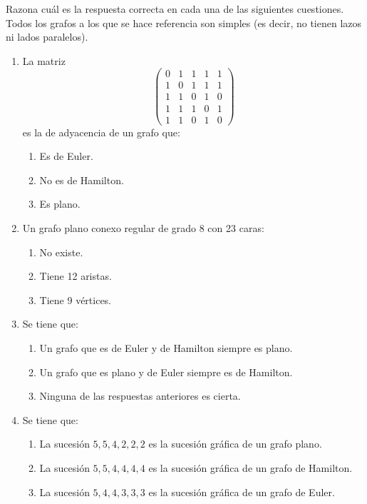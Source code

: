 \begin{ejercicio}\label{ej:1.36}
    Razona cuál es la respuesta correcta en cada una de las siguientes cuestiones. Todos los grafos a los que se hace referencia son simples (es decir, no tienen lazos ni lados paralelos).
    \begin{enumerate}
        \item La matriz
        \[
            \begin{pmatrix}
                0 & 1 & 1 & 1 & 1 \\
                1 & 0 & 1 & 1 & 1 \\
                1 & 1 & 0 & 1 & 0 \\
                1 & 1 & 1 & 0 & 1 \\
                1 & 1 & 0 & 1 & 0
            \end{pmatrix}
        \]
        es la de adyacencia de un grafo que:
        \begin{enumerate}
            \item Es de Euler.
            \item No es de Hamilton.
            \item Es plano.
        \end{enumerate}
        \item Un grafo plano conexo regular de grado 8 con 23 caras:
        \begin{enumerate}
            \item No existe.
            \item Tiene 12 aristas.
            \item Tiene 9 vértices.
        \end{enumerate}
        \item Se tiene que:
        \begin{enumerate}
            \item Un grafo que es de Euler y de Hamilton siempre es plano.
            \item Un grafo que es plano y de Euler siempre es de Hamilton.
            \item Ninguna de las respuestas anteriores es cierta.
        \end{enumerate}
        \item Se tiene que:
        \begin{enumerate}
            \item La sucesión $5, 5, 4, 2, 2, 2$ es la sucesión gráfica de un grafo plano.
            \item La sucesión $5, 5, 4, 4, 4, 4$ es la sucesión gráfica de un grafo de Hamilton.
            \item La sucesión $5, 4, 4, 3, 3, 3$ es la sucesión gráfica de un grafo de Euler.
        \end{enumerate}
    \end{enumerate}
\end{ejercicio}

